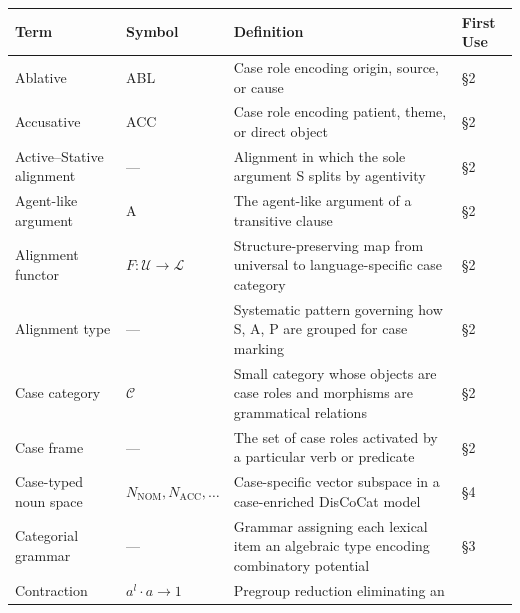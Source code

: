 \documentclass[
]{article}
\newcounter{none} %
\numberwithin{equation}{section}
\begin{document}
{\def\LTcaptype{none} %
\begin{longtable}[]{@{}
  >{\raggedright\arraybackslash}p{}
  >{\centering\arraybackslash}p{}
  >{\raggedright\arraybackslash}p{}
  >{\centering\arraybackslash}p{}@{}}
\toprule\noalign{}
\begin{minipage}[b]{\linewidth}\raggedright
Term
\end{minipage} & \begin{minipage}[b]{\linewidth}\centering
Symbol
\end{minipage} & \begin{minipage}[b]{\linewidth}\raggedright
Definition
\end{minipage} & \begin{minipage}[b]{\linewidth}\centering
First Use
\end{minipage} \\
\midrule\noalign{}
\endhead
\bottomrule\noalign{}
\endlastfoot
Ablative & ABL & Case role encoding origin, source, or cause & §2 \\
Accusative & ACC & Case role encoding patient, theme, or direct object &
§2 \\
Active--Stative alignment & --- & Alignment in which the sole argument S
splits by agentivity & §2 \\
Agent-like argument & A & The agent-like argument of a transitive clause
& §2 \\
Alignment functor & \(F: \mathcal{U} \to \mathcal{L}\) &
Structure-preserving map from universal to language-specific case
category & §2 \\
Alignment type & --- & Systematic pattern governing how S, A, P are
grouped for case marking & §2 \\
Case category & \(\mathcal{C}\) & Small category whose objects are case
roles and morphisms are grammatical relations & §2 \\
Case frame & --- & The set of case roles activated by a particular verb
or predicate & §2 \\
Case-typed noun space & \(N_{\text{NOM}}, N_{\text{ACC}}, \ldots\) &
Case-specific vector subspace in a case-enriched DisCoCat model & §4 \\
Categorial grammar & --- & Grammar assigning each lexical item an
algebraic type encoding combinatory potential & §3 \\
Contraction & \(a^l \cdot a \to 1\) & Pregroup reduction eliminating an

\end{longtable}}
\end{document}
